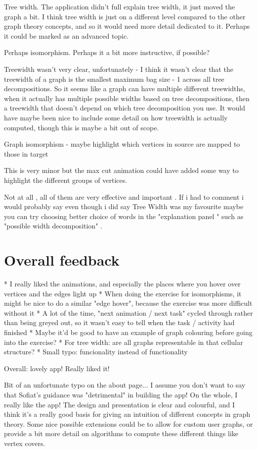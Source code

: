 Tree width. The application didn't full explain tree width, it just moved the
graph a bit. I think tree width is just on a different level compared to the
other graph theory concepts, and so it would need more detail dedicated to it.
Perhaps it could be marked as an advanced topic.

Perhaps isomorphism. Perhaps it a bit more instructive, if possible?

Treewidth wasn't very clear, unfortunately - I think it wasn't clear that the
treewidth of a graph is the smallest maximum bag size - 1 across all tree
decompositions. So it seems like a graph can have multiple different
treewidths, when it actually has multiple possible widths based on tree
decompositions, then a treewidth that doesn't depend on which tree
decomposition you use. It would have maybe been nice to include some detail on
how treewidth is actually computed, though this is maybe a bit out of scope.

Graph isomorphism - maybe highlight which vertices in source are mapped to
those in target

This is very minor but the max cut animation could have added some way to
highlight the different groups of vertices.

Not at all , all of them are very effective and important . If i had to comment
i would probably say even though i did say Tree Width was my favourite maybe
you can try choosing better choice of words in the "explanation panel " such as
"possible width decomposition" . 


\section{Overall feedback}
* I really liked the animations, and especially the places where you hover over vertices and the edges light up
  * When doing the exercise for isomorphisms, it might be nice to do a similar "edge hover", because the exercise was more difficult without it
  * A lot of the time, "next animation / next task" cycled through rather than being greyed out, so it wasn't easy to tell when the task / activity had finished
  * Maybe it'd be good to have an example of graph colouring before going into the exercise?
  * For tree width: are all graphs representable in that cellular structure?
  * Small typo: funcionality instead of functionality

Overall: lovely app! Really liked it!

Bit of an unfortunate typo on the about page... I assume you don't want to say
that Sofiat's guidance was "detrimental" in building the app! On the whole, I
really like the app! The design and presentation is clear and colourful, and I
think it's a really good basis for giving an intuition of different concepts in
graph theory. Some nice possible extensions could be to allow for custom user
graphs, or provide a bit more detail on algorithms to compute these different
things like vertex covers.


